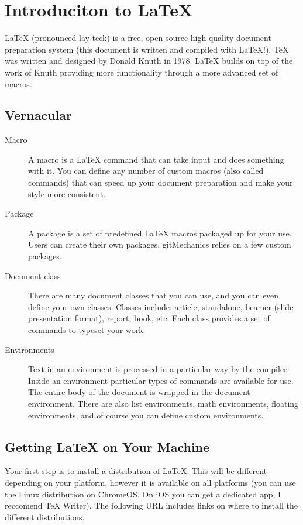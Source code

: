 \section{Introduciton to \LaTeX{}}
\LaTeX{} (pronounced lay-teck) is a free, open-source high-quality document preparation system (this document is written and compiled with \LaTeX{}!). \TeX{} was written and designed by Donald Knuth in 1978. \LaTeX{} builds on top of the work of Knuth providing more functionality through a more advanced set of macros.

\subsection{Vernacular}

\begin{description}
	\item[Macro] A macro is a \LaTeX{} command that can take input and does something with it. You can define any number of custom macros (also called commands) that can speed up your document preparation and make your style more consistent.
	\item[Package] A package is a set of predefined \LaTeX{} macros packaged up for your use. Users can create their own packages. gitMechanics relies on a few custom packages.
	\item[Document class] There are many document classes that you can use, and you can even define your own classes. Classes include: article, standalone, beamer (slide presentation format), report, book, etc. Each class provides a set of commands to typeset your work.
	\item[Environments] Text in an environment is processed in a particular way by the compiler. Inside an environment particular types of commands are available for use. The entire body of the document is wrapped in the document environment. There are also list environments, math environments, floating environments, and of course you can define custom environments.
\end{description}

\subsection{Getting \LaTeX{} on Your Machine}
Your first step is to install a distribution of \LaTeX{}. This will be different depending on your platform, however it is available on all platforms (you can use the Linux distribution on ChromeOS. On iOS you can get a dedicated app, I reccomend TeX Writer). The following URL includes links on where to install the different distributions.

